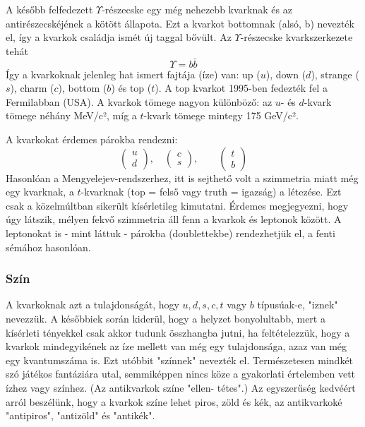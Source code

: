 \documentclass[../main.tex]{subfiles}
\begin{document}
A később felfedezett $\Upsilon$-részecske egy még nehezebb kvarknak és az antirészecskéjének a kötött állapota. Ezt a kvarkot bottomnak (alsó, b) nevezték el, így a kvarkok családja ismét új taggal bővült. Az $\Upsilon$-részecske kvarkszerkezete tehát
\begin{equation}
    \Upsilon = b \bar{b}
\end{equation}
Így a kvarkoknak jelenleg hat ismert fajtája (íze) van: up ($u$), down ($d$), strange ($s$), charm ($c$), bottom ($b$) és top ($t$). A top kvarkot 1995-ben fedezték fel a Fermilabban (USA). A kvarkok tömege
nagyon különböző: az $u$- és $d$-kvark tömege néhány MeV/c², míg a $t$-kvark tömege mintegy 175 GeV/c².

A kvarkokat érdemes párokba rendezni:
\begin{equation}
    \begin{pmatrix}
        u \\ d
    \end{pmatrix} , \quad
    \begin{pmatrix}
        c \\ s
    \end{pmatrix} , \quad \quad
    \begin{pmatrix}
        t \\ b
    \end{pmatrix}
\end{equation}
Hasonlóan a Mengyelejev-rendszerhez, itt is sejthető volt a szimmetria
miatt még egy kvarknak, a $t$-kvarknak (top = felső vagy truth = igazság)
a létezése. Ezt csak a közelmúltban sikerült kísérletileg kimutatni. Érdemes
megjegyezni, hogy úgy látszik, mélyen fekvő szimmetria áll fenn a kvarkok
és leptonok között. A leptonokat is - mint láttuk - párokba
(doublettekbe) rendezhetjük el, a fenti sémához hasonlóan.

\subsubsection*{Szín}
A kvarkoknak azt a tulajdonságát, hogy $u , d , s , c, t$ vagy $b$ típusúak-e,
"iznek" nevezzük. A későbbiek során kiderül, hogy a helyzet bonyolultabb,
mert a kísérleti tényekkel csak akkor tudunk összhangba jutni, ha feltételezzük,
hogy a kvarkok mindegyikének az íze mellett van még egy tulajdonsága,
azaz van még egy kvantumszáma is. Ezt utóbbit "színnek" nevezték el. Természetesen mindkét szó játékos fantáziára utal, semmiképpen nincs köze a
gyakorlati értelemben vett ízhez vagy színhez. (Az antikvarkok színe "ellen-
tétes".) Az egyszerűség kedvéért arról beszélünk, hogy a kvarkok színe lehet
piros, zöld és kék, az antikvarkoké "antipiros", "antizöld" és "antikék".
\end{document}
